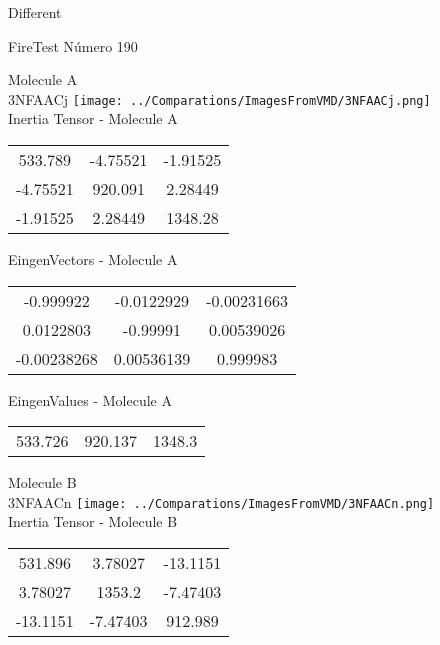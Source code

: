 \begin{center}
\vtab
\vtab
\textcolor{NavyBlue}{\Large Different}
\end{center}

 \newpage

\vtab[-2cm]
\begin{center}
{\large FireTest \tab Número 190}
\end{center}
\begin{multicols}{2}
\begin{center}

Molecule A \\ 
3NFAACj
\texttt{[image: ../Comparations/ImagesFromVMD/3NFAACj.png]}
\\
Inertia Tensor - Molecule A \\
\vtab

\begin{tabular}{|c c c|}
533.789	 & 	-4.75521	 & 	-1.91525	 \\
-4.75521	 & 	920.091	 & 	2.28449	 \\
-1.91525	 & 	2.28449	 & 	1348.28
\end{tabular}

\vtab
 EingenVectors - Molecule A     \\
\vtab
\begin{tabular}{|c c c|}
-0.999922	 & 	-0.0122929	 & 	-0.00231663	 \\
0.0122803	 & 	-0.99991	 & 	0.00539026	 \\
-0.00238268	 & 	0.00536139	 & 	0.999983
\end{tabular}

\vtab
 EingenValues - Molecule A     \\
\vtab
\begin{tabular}{|c c c|}
533.726	 & 	920.137	 & 	1348.3	 \\
\end{tabular}
\columnbreak

Molecule B \\ 
3NFAACn
\texttt{[image: ../Comparations/ImagesFromVMD/3NFAACn.png]}
\\
Inertia Tensor - Molecule B \\
\vtab

\begin{tabular}{|c c c|}
531.896	 & 	3.78027	 & 	-13.1151	 \\
3.78027	 & 	1353.2	 & 	-7.47403	 \\
-13.1151	 & 	-7.47403	 & 	912.989
\end{tabular}


\end{center}
\end{multicols}
